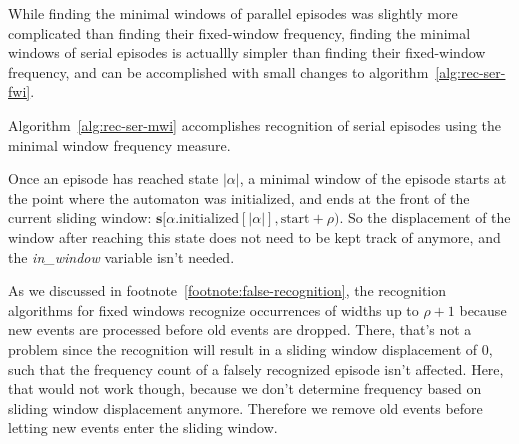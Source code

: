 While finding the minimal windows of parallel episodes was slightly more complicated than finding their fixed-window frequency, finding the minimal windows of serial episodes is actuallly simpler than finding their fixed-window frequency, and can be accomplished with small changes to algorithm~\ref{alg:rec-ser-fwi}.

Algorithm~\ref{alg:rec-ser-mwi} accomplishes recognition of serial episodes using the minimal window frequency measure.

Once an episode has reached state $ | \alpha | $, a minimal window of the episode starts at the point where the automaton was initialized, and ends at the front of the current sliding window: $ \boldsymbol{s}[\alpha \text{.initialized}[| \alpha |], \text{start} + \rho) $. So the displacement of the window after reaching this state does not need to be kept track of anymore, and the \emph{in\_window} variable isn't needed.

As we discussed in footnote~\ref{footnote:false-recognition}, the recognition algorithms for fixed windows recognize occurrences of widths up to $ \rho + 1 $ because new events are processed before old events are dropped. There, that's not a problem since the recognition will result in a sliding window displacement of $ 0 $, such that the frequency count of a falsely recognized episode isn't affected. Here, that would not work though, because we don't determine frequency based on sliding window displacement anymore. Therefore we remove old events before letting new events enter the sliding window.


